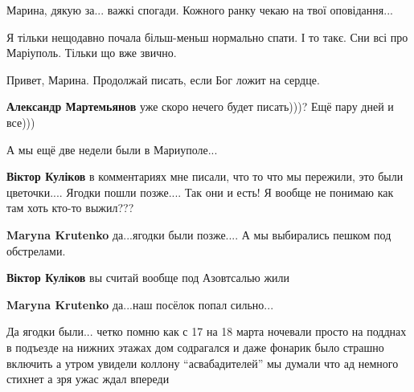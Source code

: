  
 
 
 
 

\qqSecCmt


Марина, дякую за... важкі спогади. Кожного ранку чекаю на твої оповідання...


Я тільки нещодавно почала більш-меньш нормально спати. І то такє. Сни всі про Маріуполь. Тільки що вже звично.


Привет, Марина. Продолжай писать, если Бог ложит на сердце.

\begin{itemize} %
\textbf{Александр Мартемьянов} уже скоро нечего будет писать)))? Ещё пару дней и все)))
\end{itemize} %


А мы ещё две недели были в Мариуполе...

\begin{itemize} %
\textbf{Віктор Куліков} в комментариях мне писали, что то что мы пережили, это были цветочки.... Ягодки пошли позже.... Так они и есть! Я вообще не понимаю как там хоть кто-то выжил???

\textbf{Maryna Krutenko} да...ягодки были позже....
А мы выбирались пешком под обстрелами.

\textbf{Віктор Куліков} вы считай вообще под Азовтсалью жили

\textbf{Maryna Krutenko} да...наш посёлок попал сильно...
\end{itemize} %



Да ягодки были... четко помню как с 17 на 18 марта ночевали просто на подднах в
подъезде на нижних этажах дом содрагался и даже фонарик было страшно включить а
утром увидели коллону \enquote{асвабадителей} мы думали что ад немного стихнет а зря
ужас ждал впереди

